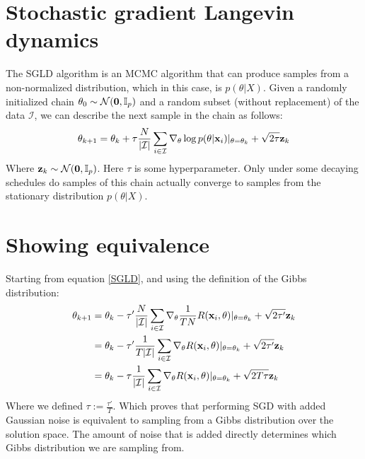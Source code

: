 \documentclass[twocolumn]{article}
\begin{document}
\section{Stochastic gradient Langevin dynamics}
The SGLD algorithm \cite{welling2011bayesian} is an MCMC algorithm that can produce samples from a non-normalized distribution, which in this case, is $p(\theta|X)$. Given a randomly initialized chain $\theta_0 \sim \mathcal{N}(
\bold{0}, \mathbb{I}_p)$ and a random subset (without replacement) of the data $\mathcal{I}$, we can describe the next sample in the chain as follows:
\begin{align}
  \theta_{k+1} = \theta_{k} + \tau \frac{N}{|\mathcal{I}|}\sum_{i \in \mathcal{I}} \nabla_{\theta}\log p(\theta|\bold{x}_i)|_{\theta = \theta_k} + \sqrt{2\tau}\bold{z}_k \label{SGLD}
\end{align}
Where $\bold{z}_k \sim \mathcal{N}(\bold{0}, \mathbb{I}_p)$. Here $\tau$ is some hyperparameter. Only under some decaying schedules do samples of this chain actually converge to samples from the stationary distribution $p(\theta|X)$.

\section{Showing equivalence}
Starting from equation \ref{SGLD}, and using the definition of the Gibbs distribution:
\begin{align*}
  \theta_{k+1} &= \theta_k - \tau' \frac{N}{|\mathcal{I}|}\sum_{i \in \mathcal{I}} \nabla_{\theta}\frac{1}{TN}R(\bold{x}_i, \theta)|_{\theta = \theta_k} + \sqrt{2\tau'}\bold{z}_k\\
          &= \theta_k - \tau' \frac{1}{T|\mathcal{I}|}\sum_{i \in \mathcal{I}} \nabla_{\theta}R(\bold{x}_i, \theta)|_{\theta = \theta_k} + \sqrt{2\tau'}\bold{z}_k\\
          &= \theta_k - \tau \frac{1}{|\mathcal{I}|}\sum_{i \in \mathcal{I}} \nabla_{\theta}R(\bold{x}_i, \theta)|_{\theta = \theta_k} + \sqrt{2T\tau}\bold{z}_k\\
\end{align*}
Where we defined $\tau := \frac{\tau'}{T}$. Which proves that performing SGD with added Gaussian noise is equivalent to sampling from a Gibbs distribution over the solution space. The amount of noise that is added directly determines which Gibbs distribution we are sampling from.
\end{document}
